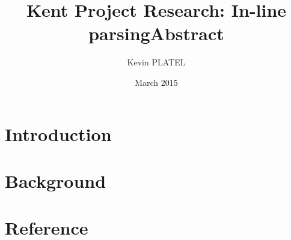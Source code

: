 \documentclass[12pt]{article}
\title{Kent Project Research: In-line parsing}
\author{Kevin PLATEL}
\date{March 2015}
\begin{document}
\maketitle

\title{Abstract}

\renewcommand{\contentsname}{Index}
\tableofcontents

\newpage{}

\section{Introduction}


\section{Background}


\section{Reference}
\nocite{*}
 
\printbibliography
\end{document}
